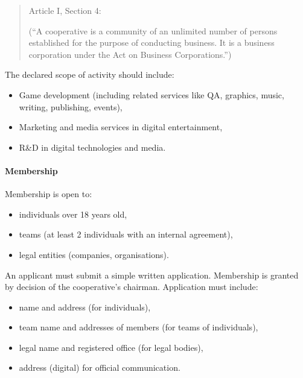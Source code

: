 \begin{quote}
    Article I, Section 4: 
    
    (\enquote{A cooperative is a community of an unlimited number of persons established for the purpose of conducting business. It is a business corporation under the Act on Business Corporations.})
\end{quote}

The declared scope of activity should include:
\begin{itemize}
    \item Game development (including related services like QA, graphics, music, writing, publishing, events),
    \item Marketing and media services in digital entertainment,
    \item R\&D in digital technologies and media.
\end{itemize}

\paragraph{Membership}
Membership is open to:
\begin{itemize}
    \item individuals over 18 years old,
    \item teams (at least 2 individuals with an internal agreement),
    \item legal entities (companies, organisations).
\end{itemize}
An applicant must submit a simple written application. Membership is granted by decision of the cooperative’s chairman. Application must include:
\begin{itemize}
    \item name and address (for individuals),
    \item team name and addresses of members (for teams of individuals),
    \item legal name and registered office (for legal bodies),
    \item address (digital) for official communication.
\end{itemize}

